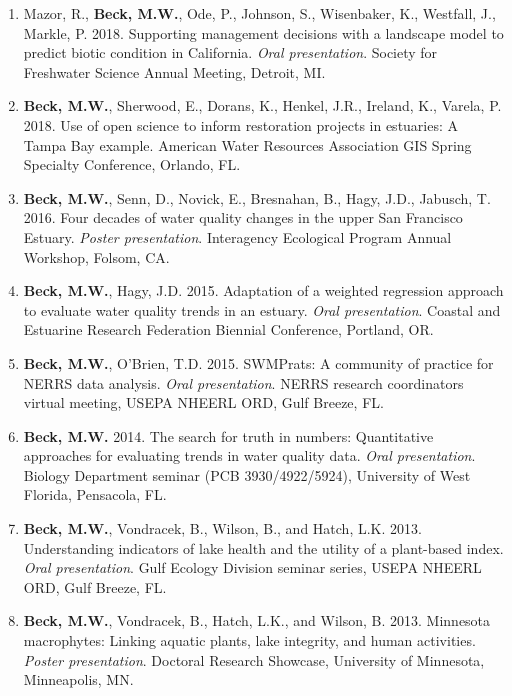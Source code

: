 \documentclass[letterpaper,12pt]{article}
\begin{document}
\begin{enumerate}
\item Mazor, R., {\bf Beck, M.W.}, Ode, P., Johnson, S., Wisenbaker, K., Westfall, J., Markle, P. 2018. Supporting management decisions with a landscape model to predict biotic condition in California. \textit{Oral presentation}. Society for Freshwater Science Annual Meeting, Detroit, MI.

\item {\bf Beck, M.W.}, Sherwood, E., Dorans, K., Henkel, J.R., Ireland, K., Varela, P. 2018. Use of open science to inform restoration projects in estuaries: A Tampa Bay example. American Water Resources Association GIS Spring Specialty Conference, Orlando, FL. 

\item {\bf Beck, M.W.}, Senn, D., Novick, E., Bresnahan, B., Hagy, J.D., Jabusch, T. 2016. Four decades of water quality changes in the upper San Francisco Estuary. \textit{Poster presentation}. Interagency Ecological Program Annual Workshop, Folsom, CA.

\item {\bf Beck, M.W.}, Hagy, J.D. 2015. Adaptation of a weighted regression approach to evaluate water quality trends in an estuary. \textit{Oral presentation}. Coastal and Estuarine Research Federation Biennial Conference, Portland, OR.

\item {\bf Beck, M.W.}, O'Brien, T.D. 2015. SWMPrats: A community of practice for NERRS data analysis. \textit{Oral presentation}. NERRS research coordinators virtual meeting, USEPA NHEERL ORD, Gulf Breeze, FL.

\item {\bf Beck, M.W.} 2014. The search for truth in numbers: Quantitative approaches for evaluating trends in water quality data. \textit{Oral presentation}. Biology Department seminar (PCB 3930/4922/5924), University of West Florida, Pensacola, FL. 

\item {\bf Beck, M.W.}, Vondracek, B., Wilson, B., and Hatch, L.K. 2013. Understanding indicators of lake health and the utility of a plant-based index. \textit{Oral presentation}. Gulf Ecology Division seminar series, USEPA NHEERL ORD, Gulf Breeze, FL.

\item {\bf Beck, M.W.}, Vondracek, B., Hatch, L.K., and Wilson, B. 2013. Minnesota macrophytes: Linking aquatic plants, lake integrity, and human activities. \textit{Poster presentation}. Doctoral Research Showcase, University of Minnesota, Minneapolis, MN.


\end{enumerate}
\end{document}
